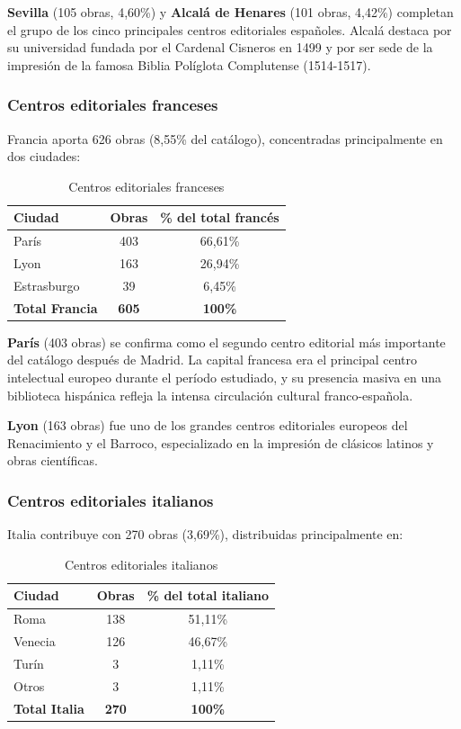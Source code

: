 \documentclass[12pt,a4paper]{article}
\begin{document}
\textbf{Sevilla} (105 obras, 4,60\%) y \textbf{Alcalá de Henares} (101 obras, 4,42\%) completan el grupo de los cinco principales centros editoriales españoles. Alcalá destaca por su universidad fundada por el Cardenal Cisneros en 1499 y por ser sede de la impresión de la famosa Biblia Políglota Complutense (1514-1517).

\subsubsection{Centros editoriales franceses}

Francia aporta 626 obras (8,55\% del catálogo), concentradas principalmente en dos ciudades:

\begin{table}[h]
\centering
\caption{Centros editoriales franceses}
\label{tab:francia}
\begin{tabular}{lcc}
\toprule
\textbf{Ciudad} & \textbf{Obras} & \textbf{\% del total francés} \\
\midrule
París & 403 & 66,61\% \\
Lyon & 163 & 26,94\% \\
Estrasburgo & 39 & 6,45\% \\
\midrule
\textbf{Total Francia} & \textbf{605} & \textbf{100\%} \\
\bottomrule
\end{tabular}
\end{table}

\textbf{París} (403 obras) se confirma como el segundo centro editorial más importante del catálogo después de Madrid. La capital francesa era el principal centro intelectual europeo durante el período estudiado, y su presencia masiva en una biblioteca hispánica refleja la intensa circulación cultural franco-española.

\textbf{Lyon} (163 obras) fue uno de los grandes centros editoriales europeos del Renacimiento y el Barroco, especializado en la impresión de clásicos latinos y obras científicas.

\subsubsection{Centros editoriales italianos}

Italia contribuye con 270 obras (3,69\%), distribuidas principalmente en:

\begin{table}[h]
\centering
\caption{Centros editoriales italianos}
\label{tab:italia}
\begin{tabular}{lcc}
\toprule
\textbf{Ciudad} & \textbf{Obras} & \textbf{\% del total italiano} \\
\midrule
Roma & 138 & 51,11\% \\
Venecia & 126 & 46,67\% \\
Turín & 3 & 1,11\% \\
Otros & 3 & 1,11\% \\
\midrule
\textbf{Total Italia} & \textbf{270} & \textbf{100\%} \\
\bottomrule
\end{tabular}
\end{table}
\end{document}
